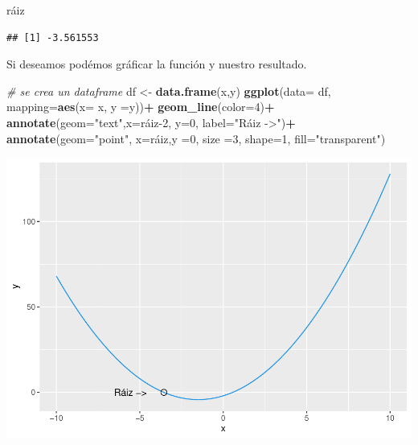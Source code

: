 \documentclass[11pt,]{article}
\newenvironment{Shaded}{\begin{snugshade}}{\end{snugshade}}
\newcommand{\CommentTok}[1]{\textcolor[rgb]{0.56,0.35,0.01}{\textit{#1}}}
\newcommand{\DataTypeTok}[1]{\textcolor[rgb]{0.13,0.29,0.53}{#1}}
\newcommand{\DecValTok}[1]{\textcolor[rgb]{0.00,0.00,0.81}{#1}}
\newcommand{\KeywordTok}[1]{\textcolor[rgb]{0.13,0.29,0.53}{\textbf{#1}}}
\newcommand{\NormalTok}[1]{#1}
\newcommand{\OperatorTok}[1]{\textcolor[rgb]{0.81,0.36,0.00}{\textbf{#1}}}
\newcommand{\StringTok}[1]{\textcolor[rgb]{0.31,0.60,0.02}{#1}}
\begin{document}
\begin{Shaded}
\begin{Highlighting}[]
\NormalTok{ráiz}
\end{Highlighting}
\end{Shaded}

\begin{verbatim}
## [1] -3.561553
\end{verbatim}

Si deseamos podémos gráficar la función y nuestro resultado.

\begin{Shaded}
\begin{Highlighting}[]
\CommentTok{# se crea un dataframe}
\NormalTok{df <-}\StringTok{ }\KeywordTok{data.frame}\NormalTok{(x,y)  }
\KeywordTok{ggplot}\NormalTok{(}\DataTypeTok{data=}\NormalTok{ df, }\DataTypeTok{mapping=}\KeywordTok{aes}\NormalTok{(}\DataTypeTok{x=}\NormalTok{ x, }\DataTypeTok{y =}\NormalTok{y))}\OperatorTok{+}
\StringTok{  }\KeywordTok{geom_line}\NormalTok{(}\DataTypeTok{color=}\DecValTok{4}\NormalTok{)}\OperatorTok{+}
\StringTok{  }\KeywordTok{annotate}\NormalTok{(}\DataTypeTok{geom=}\StringTok{"text"}\NormalTok{,}\DataTypeTok{x=}\NormalTok{ráiz}\DecValTok{-2}\NormalTok{, }\DataTypeTok{y=}\DecValTok{0}\NormalTok{, }\DataTypeTok{label=}\StringTok{"Ráiz ->"}\NormalTok{)}\OperatorTok{+}
\StringTok{  }\KeywordTok{annotate}\NormalTok{(}\DataTypeTok{geom=}\StringTok{"point"}\NormalTok{, }\DataTypeTok{x=}\NormalTok{ráiz,}\DataTypeTok{y =}\DecValTok{0}\NormalTok{, }\DataTypeTok{size =}\DecValTok{3}\NormalTok{, }\DataTypeTok{shape=}\DecValTok{1}\NormalTok{, }\DataTypeTok{fill=}\StringTok{"transparent"}\NormalTok{)}
\end{Highlighting}
\end{Shaded}

\includegraphics{Bisección_files/figure-latex/unnamed-chunk-4-1.pdf}

\newpage
\singlespacing 
\end{document}
